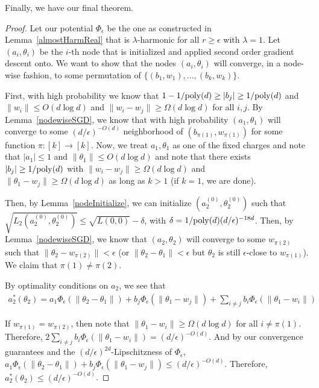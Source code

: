 Finally, we have our final theorem.

\nodewise*

\begin{proof}
Let our potential $\Phi_{\epsilon}$ be the one as constructed in Lemma~\ref{almostHarmReal} that is $\lambda$-harmonic for all $r \geq \epsilon$ with $\lambda = 1$. Let $(a_i, \theta_i)$ be the $i$-th node that is initialized and applied second order gradient descent onto. We want to show that the nodes $(a_i, \theta_i)$ will converge, in a node-wise fashion, to some permutation of $\{(b_1,w_1),...,(b_k,w_k)\}$. 

First, with high probability we know that $1 - 1/\mathrm{poly}(d) \geq |b_j| \geq 1/\mathrm{poly}(d)$ and $\|w_i\|\leq O(d\log d)$ and $\|w_i - w_j \| \geq \Omega(d\log d)$ for all $i, j$. By Lemma~\ref{nodewiseSGD}, we know that with high probability $(a_1,\theta_1)$ will converge to some $(d/\epsilon)^{-O(d)}$ neighborhood of $(b_{\pi(1)}, w_{\pi(1)})$ for some function $\pi: [k] \to [k]$. Now, we treat $a_1, \theta_1$ as one of the fixed charges and note that $|a_1| \leq 1$ and $\|\theta_1\| \leq O(d\log d)$ and note that there exists $|b_j| \geq 1/\mathrm{poly}(d)$ with $\|w_i - w_j\| \geq \Omega(d\log d)$ and $\|\theta_1 - w_j \| \geq \Omega(d\log d)$ as long as $k > 1$ (if $k = 1$, we are done). 

Then, by Lemma~\ref{nodeInitialize}, we can initialize $(a_2^{(0)}, \theta_2^{(0)})$ such that $\sqrt{L_2(a_2^{(0)}, \theta_2^{(0)})} \leq \sqrt{L(0,0)} - \delta$, with $\delta = 1/\mathrm{poly}(d) (d/\epsilon)^{-18d}$. Then, by Lemma~\ref{nodewiseSGD}, we know that $(a_2, \theta_2)$ will converge to some $w_{\pi(2)}$ such that $\|\theta_2 - w_{\pi(2)}\| <\epsilon$ (or $\|\theta_2 - \theta_1 \| < \epsilon$ but $\theta_2$ is still $\epsilon$-close to $w_{\pi(1)}$). We claim that $\pi(1) \neq \pi(2)$.

By optimality conditions on $a_2$, we see that 
\begin{align*}
a_2^*(\theta_2) = a_1 \Phi_{\epsilon}(\|\theta_2 - \theta_1\|) + b_j \Phi_{\epsilon}(\|\theta_1 - w_j\|) +  \sum_{i \neq j} b_i \Phi_{\epsilon}(\|\theta_1 - w_i\|)
\end{align*}

If $w_{\pi(1)} = w_{\pi(2)}$, then note that $\|\theta_1 - w_i \| \geq \Omega(d\log d)$ for all $i \neq \pi(1)$. Therefore, $2 \sum_{i \neq j} b_i \Phi_{\epsilon}(\|\theta_1 - w_i\|) = (d/\epsilon)^{-O(d)}$. And by our convergence guarantees and the $(d/\epsilon)^{2d}$-Lipschitzness of $\Phi_{\epsilon}$, $ a_1 \Phi_{\epsilon}(\|\theta_2 - \theta_1\|) + b_j \Phi_{\epsilon}(\|\theta_1 - w_j\|) \leq (d/\epsilon)^{-O(d)}$. Therefore, $a_2^*(\theta_2) \leq (d/\epsilon)^{-O(d)}$. 


\end{proof}
